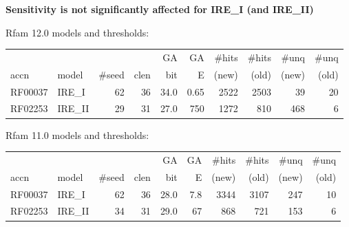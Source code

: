 \documentclass[landscape]{slides}
\begin{document}
\begin{slide}
\small
\begin{center}
\textbf{Sensitivity is not significantly affected for IRE\_I (and IRE\_II)}

\tt

Rfam 12.0 models and thresholds:

%

\begin{tabular}{ll|rr|rr|rrrr|}
\tiny
     &       &        &      & GA  & GA & \#hits & \#hits & \#unq & \#unq \\
accn & model & \#seed & clen & bit & E  &  (new) & (old)  & (new) & (old) \\ \hline
RF00037 & IRE\_I & 62 & 36   & 34.0 & 0.65 & 2522   & 2503   & 39    & 20 \\
RF02253 & IRE\_II & 29 & 31  & 27.0 & 750  & 1272   & 810   & 468   & 6 \\
\end{tabular}

\vspace{1.5in}

Rfam 11.0 models and thresholds:

%
\begin{tabular}{ll|rr|rr|rrrr|}
\tiny
     &       &        &      & GA  & GA & \#hits & \#hits & \#unq & \#unq \\
accn & model & \#seed & clen & bit & E  &  (new) & (old)  & (new) & (old) \\ \hline
RF00037 & IRE\_I  & 62 & 36   & 28.0 & 7.8 & 3344   & 3107   & 247    & 10 \\
RF02253 & IRE\_II & 34 & 31   & 29.0 & 67  &  868   &  721   & 153    & 6 \\
\end{tabular}
\end{center}

\vfill
\end{slide}
\end{document}

